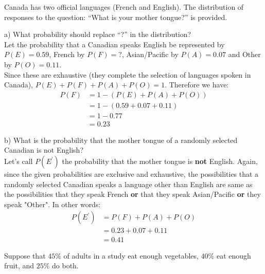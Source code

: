 \documentclass[boxes, qed]{homework}
\begin{document}
\newenvironment{amatrix}[1]{%
  \left[\begin{array}{@{}*{#1}{c}|c@{}}
}{%
  \end{array}\right]
}

\newenvironment{augmatrix}[1]{%
  \left[\begin{array}{#1}
}{%
  \end{array}\right]
}

\begin{problem}
  Canada has two official languages (French and English). 
  The distribution of responses to the question: “What is your mother tongue?”
  is provided.
\end{problem}
\begin{solution}
  a) What probability should replace “?” in the distribution?\\
  
  Let the probability that a Canadian speaks English be represented by $P(E)=0.59$, 
  French by $P(F)=?$, Asian/Pacific by $P(A)=0.07$ and Other by $P(O)=0.11$.\\

  Since these are exhaustive (they complete the selection of languages spoken 
  in Canada), $P(E)+P(F)+P(A)+P(O) = 1$. Therefore we have:
  \begin{align*}
    P(F) &= 1-(P(E)+P(A)+P(O))\\
    &= 1-(0.59+0.07+0.11)\\
    & = 1-0.77\\
    & = \boxed{0.23}
  \end{align*}

  b) What is the probability that the mother tongue of a randomly 
  selected Canadian is not English?\\

  Let's call $P(E^{'})$ the probability that the mother tongue
  is \textbf{not} English. Again, since the given probabilities 
  are exclusive and exhaustive, the possibilities that a randomly
  selected Canadian speaks a language other than English are same as
  the possibilities that they speak French \textbf{or} that they
  speak Asian/Pacific \textbf{or} they speak "Other". In other words:
  \begin{align*}
    P(E^{'}) &= P(F) + P(A) + P(O)\\
    &= 0.23 + 0.07 + 0.11\\
    &= \boxed{0.41}
  \end{align*}
\end{solution}
\begin{problem}
  Suppose that $45\%$ of adults in a study eat enough vegetables, 
  $40\%$ eat enough fruit, and
  $25\%$ do both.
\end{problem}
\end{document}
